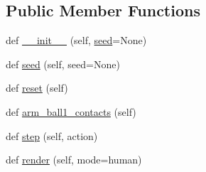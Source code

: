 \subsection*{Public Member Functions}
\begin{DoxyCompactItemize}
\item 
def \hyperlink{classtaxons_1_1gym__billiard_1_1envs_1_1billiard__hard__env_1_1_billiard_hard_env_a2ee2428bca34dd15fe23ebe3adb26814}{\+\_\+\+\_\+init\+\_\+\+\_\+} (self, \hyperlink{classtaxons_1_1gym__billiard_1_1envs_1_1billiard__hard__env_1_1_billiard_hard_env_a29762f0d7f4787aa899e66922505990f}{seed}=None)
\item 
def \hyperlink{classtaxons_1_1gym__billiard_1_1envs_1_1billiard__hard__env_1_1_billiard_hard_env_a29762f0d7f4787aa899e66922505990f}{seed} (self, seed=None)
\item 
def \hyperlink{classtaxons_1_1gym__billiard_1_1envs_1_1billiard__hard__env_1_1_billiard_hard_env_ac08ff208a36fb54087b974e5432f2036}{reset} (self)
\item 
def \hyperlink{classtaxons_1_1gym__billiard_1_1envs_1_1billiard__hard__env_1_1_billiard_hard_env_a76dc127a0f66f7be76266470c3824f0f}{arm\+\_\+ball1\+\_\+contacts} (self)
\item 
def \hyperlink{classtaxons_1_1gym__billiard_1_1envs_1_1billiard__hard__env_1_1_billiard_hard_env_a229900f329a48a424b264b19b02b19e5}{step} (self, action)
\item 
def \hyperlink{classtaxons_1_1gym__billiard_1_1envs_1_1billiard__hard__env_1_1_billiard_hard_env_ac1c5de2131898ec7168edf6a4b77eab0}{render} (self, mode=\textquotesingle{}human\textquotesingle{})
\end{DoxyCompactItemize}
